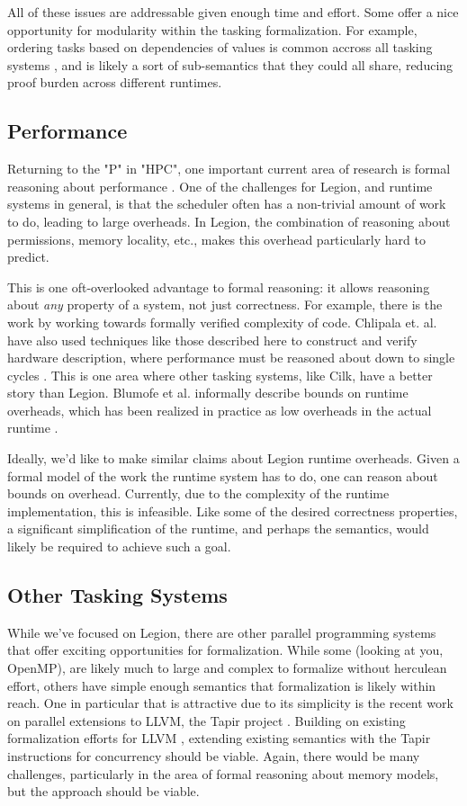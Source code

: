 \documentclass[sigconf]{acmart}
\begin{document}
All of these issues are addressable given enough time and effort. Some offer
a nice opportunity for modularity within the tasking formalization. For example, 
ordering tasks based on dependencies of values is common accross all tasking
systems \cite{cilk, hpx}, and is likely a sort of sub-semantics that they could
all share, reducing proof burden across different runtimes.

\subsection{Performance}

Returning to the "P" in "HPC", one important current area of research is formal
reasoning about performance \cite{performance}. One of the challenges for
Legion, and runtime systems in general, is that the scheduler often has a
non-trivial amount of work to do, leading to large overheads. In Legion, the
combination of reasoning about permissions, memory locality, etc., makes this
overhead particularly hard to predict. 

This is one oft-overlooked advantage to formal reasoning: it allows reasoning
about \emph{any} property of a system, not just correctness. For example, there
is the work by \cite{?} working towards formally verified complexity of code.
Chlipala et. al. have also used techniques like those described here to construct
and verify hardware description, where performance must be reasoned about down
to single cycles \cite{chlipala}.  This is one area where other tasking
systems, like Cilk, have a better story than Legion. Blumofe et al. informally
describe bounds on runtime overheads, which has been realized in practice as
low overheads in the actual runtime \cite{cilk}. 

Ideally, we'd like to make similar claims about Legion runtime overheads.
Given a formal model of the work the runtime system has to do, one can reason
about bounds on overhead. Currently, due to the complexity of the runtime
implementation, this is infeasible. Like some of the desired correctness
properties, a significant simplification of the runtime, and perhaps the
semantics, would likely be required to achieve such a goal.


\subsection{Other Tasking Systems}

While we've focused on Legion, there are other parallel programming systems
that offer exciting opportunities for formalization. While some (looking at
you, OpenMP), are likely much to large and complex to formalize without
herculean effort, others have simple enough semantics that formalization is
likely within reach. One in particular that is attractive due to its simplicity
is the recent work on parallel extensions to LLVM, the Tapir project
\cite{tapir}. Building on existing formalization efforts for LLVM
\cite{verillvm}, extending existing semantics with the Tapir instructions for
concurrency should be viable. Again, there would be many challenges,
particularly in the area of formal reasoning about memory models, but the
approach should be viable.
\end{document}

